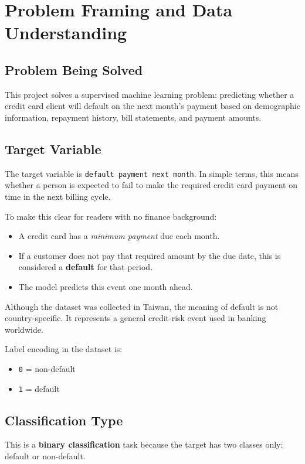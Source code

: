 \section{Problem Framing and Data Understanding}

\subsection{Problem Being Solved}
This project solves a supervised machine learning problem: predicting whether a credit card client will default on the next month's payment based on demographic information, repayment history, bill statements, and payment amounts.

\subsection{Target Variable}
The target variable is \texttt{default payment next month}. In simple terms, this means whether a person is expected to fail to make the required credit card payment on time in the next billing cycle.

To make this clear for readers with no finance background:
\begin{itemize}
	\item A credit card has a \textit{minimum payment} due each month.
	\item If a customer does not pay that required amount by the due date, this is considered a \textbf{default} for that period.
	\item The model predicts this event one month ahead.
\end{itemize}

Although the dataset was collected in Taiwan, the meaning of default is not country-specific. It represents a general credit-risk event used in banking worldwide.

Label encoding in the dataset is:
\begin{itemize}
	\item \texttt{0} = non-default
	\item \texttt{1} = default
\end{itemize}

\subsection{Classification Type}
This is a \textbf{binary classification} task because the target has two classes only: default or non-default.

